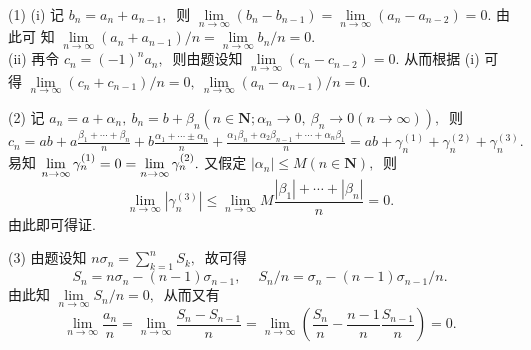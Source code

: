 	\begin{solution}
		(1) (i) 记  $b_{n}=a_{n}+a_{n-1} ,\ $ 则  $\lim\limits _{n \rightarrow \infty}\left(b_{n}-b_{n-1}\right)=\lim\limits _{n \rightarrow \infty}\left(a_{n}-a_{n-2}\right)=0 .$ 由此可 知  $\lim\limits_{n \rightarrow \infty}\left(a_{n}+a_{n-1}\right) / n=\lim\limits _{n \rightarrow \infty} b_{n} / n=0 .$\\
		(ii) 再令  $c_{n}=(-1)^{n} a_{n} ,\ $ 则由题设知  $\lim\limits _{n \rightarrow \infty}\left(c_{n}-c_{n-2}\right)=0 .$ 从而根据 (i) 可得  $\lim\limits_{n \rightarrow \infty}\left(c_{n}+c_{n-1}\right) / n=0,\  \lim\limits_{n \rightarrow \infty}\left(a_{n}-a_{n-1}\right) / n=0 .$
		
		(2) 记  $a_{n}=a+\alpha_{n},\  b_{n}=b+\beta_{n}\left(n \in \mathbf{N} ; \alpha_{n} \rightarrow 0,\  \beta_{n} \rightarrow 0(n \rightarrow \infty)\right) ,\ $ 则
		$c_{n}=a b+a \frac{\beta_{1}+\cdots+\beta_{n}}{n}+b \frac{\alpha_{1}+\cdots \pm \alpha_{n}}{n}+\frac{\alpha_{1} \beta_{n}+\alpha_{2} \beta_{n-1}+\cdots+\alpha_{n} \beta_{1}}{n} 
		=a b+\gamma_{n}^{(1)}+\gamma_{n}^{(2)}+\gamma_{n}^{(3)} .$
		易知  $\lim\limits_{n \rightarrow \infty} \gamma_{n}^{(1)}=0=\lim\limits \limits_{n \rightarrow \infty}\gamma_{n}^{(2)} .$ 又假定  $\left|\alpha_{n}\right| \leqslant M(n \in \mathbf{N}) ,\ $ 则
		$$\lim\limits_{n \rightarrow \infty}\left|\gamma_{n}^{(3)}\right| \leqslant \lim\limits_{n \rightarrow \infty} M \frac{\left|\beta_{1}\right|+\cdots+\left|\beta_{n}\right|}{n}=0 .$$
		由此即可得证.
		
		(3) 由题设知  $n \sigma_{n}=\sum\limits_{k=1}^{n} S_{k} ,\ $ 故可得
		$$S_{n}=n \sigma_{n}-(n-1) \sigma_{n-1},\  \quad S_{n} / n=\sigma_{n}-(n-1) \sigma_{n-1} / n .$$
		由此知  $\lim\limits _{n \rightarrow \infty} S_{n} / n=0 ,\ $ 从而又有
		$$\lim\limits _{n \rightarrow \infty} \frac{a_{n}}{n}=\lim\limits _{n \rightarrow \infty} \frac{S_{n}-S_{n-1}}{n}=\lim\limits _{n \rightarrow \infty}\left(\frac{S_{n}}{n}-\frac{n-1}{n} \frac{S_{n-1}}{n}\right)=0 .$$ 
	\end{solution}